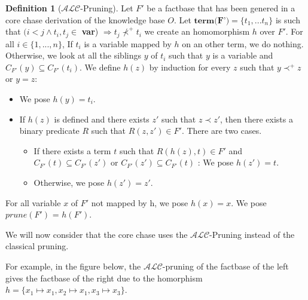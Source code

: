 \documentclass{article}
\theoremstyle{definition}
\newtheorem{definition}{Definition}[section]
\theoremstyle{remark}
\begin{document}
\begin{definition}[$\mathcal{ALC}$-Pruning]
Let $F'$ be a factbase that has been genered in a core chase derivation of the knowledge base $O$. Let $\textbf{term(F')} = \{t_1,...t_n\}$ is such that $(i<j \wedge t_i,t_j \in$ \textbf{var}) $\Rightarrow t_j \nprec^+ t_i$
we create an homomorphism $h$ over $F'$.
For all $i \in \{1,...,n\}$,
If $t_i$ is a variable mapped by $h$ on an other term, we do nothing.
Otherwise, we look at all the siblings $y$ of $t_i$ such that $y$ is a variable and $C_{F'}(y) \subseteq C_{F'}(t_i)$. We define $h(z)$ by induction for every $z$ such that $y \prec^+ z$ or $y = z$:
\begin{itemize}
\item We pose $h(y) = t_i$.
\item If $h(z)$ is defined and there exists $z'$ such that $z \prec z'$, then there exists a binary predicate $R$ such that $R(z,z') \in F'$. There are two cases.
\begin{itemize}
\item If there exists a term $t$ such that $R(h(z),t) \in F'$ and $C_{F'}(t) \subseteq C_{F'}(z')$ or $C_{F'}(z') \subseteq C_{F'}(t)$ : We pose $h(z') = t$.
\item Otherwise, we pose $h(z') = z'$. 
\end{itemize}
\end{itemize}
For all variable $x$ of $F'$ not mapped by h, we pose $h(x) = x$. We pose \emph{$\textit{prune}(F')$} = $h(F')$.
\end{definition}

We will now consider that the core chase uses the $\mathcal{ALC}$-Pruning instead of the classical pruning.

For example, in the figure below, the $\mathcal{ALC}$-pruning of the factbase of the left gives the factbase of the right due to the homorphism $h = \{x_1 \mapsto x_1, x_2 \mapsto x_1, x_3 \mapsto x_3\}$.
\end{document}
